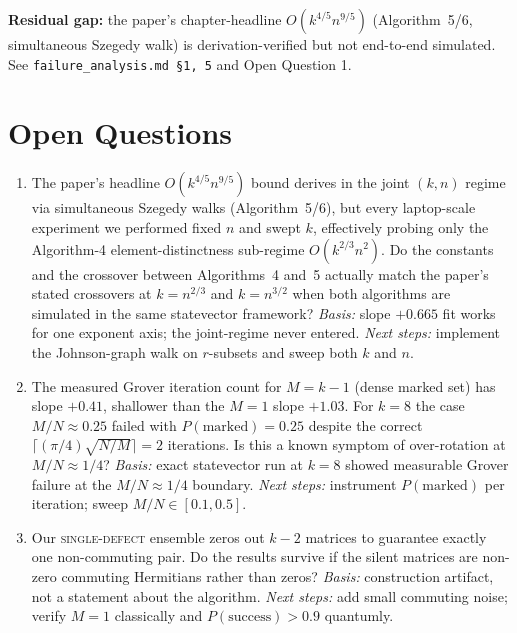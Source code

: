 \documentclass[11pt,letterpaper]{article}
\begin{document}
\textbf{Residual gap:} the paper's chapter-headline $O(k^{4/5} n^{9/5})$
(Algorithm~5/6, simultaneous Szegedy walk) is derivation-verified but not
end-to-end simulated. See \texttt{failure\_analysis.md \S 1, 5} and Open
Question 1.

\section{Open Questions}

\begin{enumerate}
\item[Q1.] The paper's headline $O(k^{4/5} n^{9/5})$ bound derives in the
      joint $(k,n)$ regime via simultaneous Szegedy walks (Algorithm~5/6), but
      every laptop-scale experiment we performed fixed $n$ and swept $k$,
      effectively probing only the Algorithm-4 element-distinctness sub-regime
      $O(k^{2/3} n^2)$. Do the constants and the crossover between
      Algorithms~4 and~5 actually match the paper's stated crossovers at
      $k = n^{2/3}$ and $k = n^{3/2}$ when both algorithms are simulated in
      the same statevector framework?
      \emph{Basis:} slope $+0.665$ fit works for one exponent axis; the
      joint-regime never entered.
      \emph{Next steps:} implement the Johnson-graph walk on $r$-subsets and
      sweep both $k$ and $n$.

\item[Q2.] The measured Grover iteration count for $M = k-1$ (dense marked
      set) has slope $+0.41$, shallower than the $M=1$ slope $+1.03$. For
      $k=8$ the case $M/N \approx 0.25$ failed with $P(\text{marked}) = 0.25$
      despite the correct $\lceil (\pi/4)\sqrt{N/M} \rceil = 2$ iterations. Is
      this a known symptom of over-rotation at $M/N \approx 1/4$?
      \emph{Basis:} exact statevector run at $k=8$ showed measurable Grover
      failure at the $M/N \approx 1/4$ boundary.
      \emph{Next steps:} instrument $P(\text{marked})$ per iteration; sweep
      $M/N \in [0.1, 0.5]$.

\item[Q3.] Our \textsc{single-defect} ensemble zeros out $k-2$ matrices to
      guarantee exactly one non-commuting pair. Do the results survive if the
      silent matrices are non-zero commuting Hermitians rather than zeros?
      \emph{Basis:} construction artifact, not a statement about the
      algorithm.
      \emph{Next steps:} add small commuting noise; verify $M=1$ classically
      and $P(\text{success}) > 0.9$ quantumly.


\end{enumerate}
\end{document}
